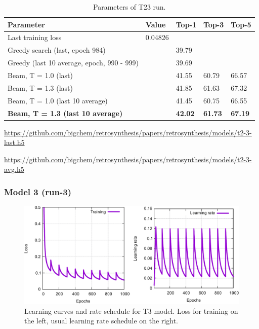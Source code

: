 \documentclass{article}
\begin{document}
\begin{table}[h!]
\caption{Parameters of T23 run.}
  \centering
  \begin{tabular}{p{8.2cm}p{1.5cm}p{1.5cm}p{1.5cm}p{1.5cm}}
    \toprule
    Parameter & Value & Top-1 & Top-3 & Top-5 \\
    \midrule
    Last training loss & 0.04826 & & & \\
    \midrule
    Greedy search (last, epoch 984) & & 39.79 & & \\
    Greedy (last 10 average, epoch, 990 -  999) & & 39.69 & & \\
    \midrule
    Beam, T = 1.0 (last) & & 41.55 & 60.79 & 66.57  \\
    Beam, T = 1.3 (last) & & 41.85 & 61.63  & 67.32 \\ 
    \midrule
    Beam, T = 1.0 (last 10 average) & & 41.45  & 60.75 &  66.55\\
    \textbf{Beam, T = 1.3 (last 10 average)} & & \textbf{42.02}  & \textbf{61.73}  & \textbf{67.19} \\ 
    \bottomrule
  \end{tabular}
  \label{tbl:t11}

\end{table} 

\url{https://github.com/bigchem/retrosynthesis/papers/retrosynthesis/models/t2-3-last.h5}

\url{https://github.com/bigchem/retrosynthesis/papers/retrosynthesis/models/t2-3-avg.h5}
 
 \newpage
 \subsubsection{Model 3 (run-3)}
 
\begin{figure}[h!]
  \centering
  \includegraphics[width = 16.5cm]{images/t3-1.pdf}
  \caption{Learning curves and rate schedule for T3 model. Loss for training on the left, usual learning rate schedule on the right.}
  \label{fig:t11}
\end{figure}
\end{document}
